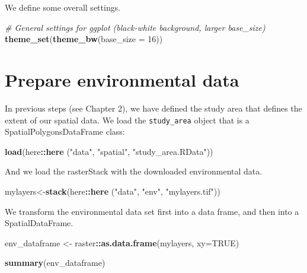 \documentclass[
]{book}
\newenvironment{Shaded}{\begin{snugshade}}{\end{snugshade}}
\newcommand{\AttributeTok}[1]{\textcolor[rgb]{0.13,0.29,0.53}{#1}}
\newcommand{\CommentTok}[1]{\textcolor[rgb]{0.56,0.35,0.01}{\textit{#1}}}
\newcommand{\ConstantTok}[1]{\textcolor[rgb]{0.56,0.35,0.01}{#1}}
\newcommand{\DecValTok}[1]{\textcolor[rgb]{0.00,0.00,0.81}{#1}}
\newcommand{\FunctionTok}[1]{\textcolor[rgb]{0.13,0.29,0.53}{\textbf{#1}}}
\newcommand{\NormalTok}[1]{#1}
\newcommand{\OtherTok}[1]{\textcolor[rgb]{0.56,0.35,0.01}{#1}}
\newcommand{\SpecialCharTok}[1]{\textcolor[rgb]{0.81,0.36,0.00}{\textbf{#1}}}
\newcommand{\StringTok}[1]{\textcolor[rgb]{0.31,0.60,0.02}{#1}}
\begin{document}
We define some overall settings.

\begin{Shaded}
\begin{Highlighting}[]
\CommentTok{\# General settings for ggplot (black{-}white background, larger base\_size)}
\FunctionTok{theme\_set}\NormalTok{(}\FunctionTok{theme\_bw}\NormalTok{(}\AttributeTok{base\_size =} \DecValTok{16}\NormalTok{))}
\end{Highlighting}
\end{Shaded}

\section{Prepare environmental data}\label{prepare-environmental-data}

In previous steps (see Chapter 2), we have defined the study area that defines the extent of our spatial data. We load the \texttt{study\_area} object that is a SpatialPolygonsDataFrame class:

\begin{Shaded}
\begin{Highlighting}[]
\FunctionTok{load}\NormalTok{(here}\SpecialCharTok{::}\FunctionTok{here}\NormalTok{ (}\StringTok{"data"}\NormalTok{, }\StringTok{"spatial"}\NormalTok{, }\StringTok{"study\_area.RData"}\NormalTok{))}
\end{Highlighting}
\end{Shaded}

And we load the rasterStack with the downloaded environmental data.

\begin{Shaded}
\begin{Highlighting}[]
\NormalTok{mylayers}\OtherTok{\textless{}{-}}\FunctionTok{stack}\NormalTok{(here}\SpecialCharTok{::}\FunctionTok{here}\NormalTok{ (}\StringTok{"data"}\NormalTok{, }\StringTok{"env"}\NormalTok{, }\StringTok{"mylayers.tif"}\NormalTok{))}
\end{Highlighting}
\end{Shaded}

We transform the environmental data set first into a data frame, and then into a SpatialDataFrame.

\begin{Shaded}
\begin{Highlighting}[]
\NormalTok{env\_dataframe }\OtherTok{\textless{}{-}}\NormalTok{ raster}\SpecialCharTok{::}\FunctionTok{as.data.frame}\NormalTok{(mylayers, }\AttributeTok{xy=}\ConstantTok{TRUE}\NormalTok{)}

\FunctionTok{summary}\NormalTok{(env\_dataframe)}
\end{Highlighting}
\end{Shaded}
\end{document}
